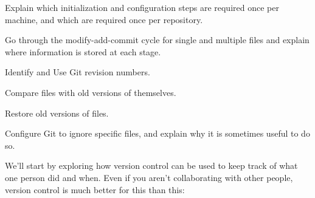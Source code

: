 \documentclass{book}
\begin{document}
\begin{objectives}
\begin{swcitemize}
\item
  Explain which initialization and configuration steps are required once
  per machine, and which are required once per repository.
\item
  Go through the modify-add-commit cycle for single and multiple files
  and explain where information is stored at each stage.
\item
  Identify and Use Git revision numbers.
\item
  Compare files with old versions of themselves.
\item
  Restore old versions of files.
\item
  Configure Git to ignore specific files, and explain why it is
  sometimes useful to do so.
\end{swcitemize}
\end{objectives}

We'll start by exploring how version control can be used to keep track
of what one person did and when. Even if you aren't collaborating with
other people, version control is much better for this than this:

\end{document}
